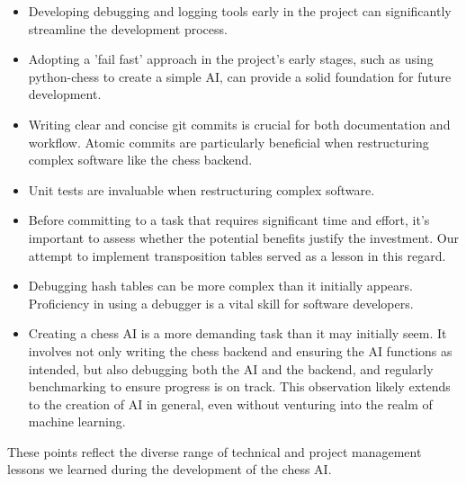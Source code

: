 \begin{itemize}
\item Developing debugging and logging tools early in the project can significantly streamline the development process.
\item Adopting a 'fail fast' approach in the project's early stages, such as using python-chess to create a simple AI, can provide a solid foundation for future development.
\item Writing clear and concise git commits is crucial for both documentation and workflow. Atomic commits are particularly beneficial when restructuring complex software like the chess backend.
\item Unit tests are invaluable when restructuring complex software.
\item Before committing to a task that requires significant time and effort, it's important to assess whether the potential benefits justify the investment. Our attempt to implement transposition tables served as a lesson in this regard.
\item Debugging hash tables can be more complex than it initially appears. Proficiency in using a debugger is a vital skill for software developers.
\item Creating a chess AI is a more demanding task than it may initially seem. It involves not only writing the chess backend and ensuring the AI functions as intended, but also debugging both the AI and the backend, and regularly benchmarking to ensure progress is on track. This observation likely extends to the creation of AI in general, even without venturing into the realm of machine learning.
\end{itemize}

These points reflect the diverse range of technical and project management lessons we learned during the development of the chess AI.
